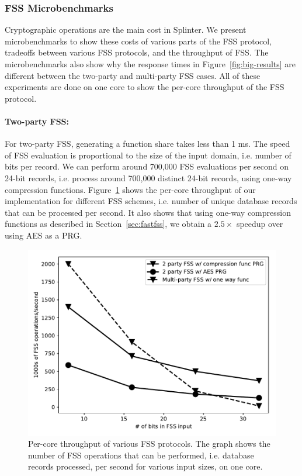 \subsubsection{FSS Microbenchmarks}
\label{sec:micro}
Cryptographic operations are the main
cost in Splinter.
We present microbenchmarks to show these costs of various
parts of the FSS protocol, 
tradeoffs between various FSS protocols,
and the throughput of FSS. The microbenchmarks
also show why the response times in Figure~\ref{fig:big-results} 
are different between the two-party and multi-party FSS cases.
All of these experiments are done on one core to show the 
per-core throughput of the FSS protocol.

\paragraph{Two-party FSS:}
For two-party FSS, generating a function share takes less than 1 ms.
The speed of FSS evaluation is proportional to the size of the input domain, i.e. number of bits per record. 
We can perform around 700,000 FSS evaluations per second on
24-bit records, i.e. process around 700,000
distinct 24-bit records, using one-way compression functions.
Figure~\ref{fig:micro2} shows the per-core throughput of our implementation
for different FSS schemes, i.e. number of unique database records that can be processed
per second. It also shows that using one-way compression functions
as described in Section~\ref{sec:fastfss}, we obtain a $2.5\times$ speedup over using 
AES as a PRG.

\begin{figure}
	\centering
	\includegraphics[width=\textwidth]{splinter-figs/micro.pdf}
	\caption[Per-core throughput of various FSS protocols.]{Per-core throughput of various FSS protocols. 
		The graph shows the number of FSS operations that can be performed, i.e. database records processed, per second for various input sizes, on one core.}
	\label{fig:micro2}
\end{figure}


